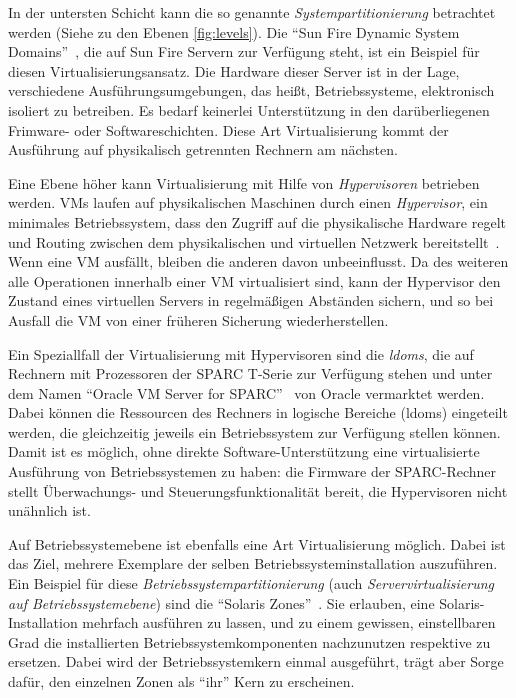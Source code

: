 In der untersten Schicht kann die so genannte
\emph{Systempartitionierung} betrachtet werden (Siehe zu den Ebenen
\autoref{fig:levels}). Die "`Sun Fire Dynamic System
Domains"'~\cite{Shoumack2007:Beginners-Guid-}, die auf Sun Fire
Servern zur Verfügung steht, ist ein Beispiel für diesen
Virtualisierungsansatz. Die Hardware dieser Server ist in der Lage,
verschiedene Ausführungsumgebungen, das heißt, Betriebssysteme,
elektronisch isoliert zu betreiben. Es bedarf keinerlei Unterstützung
in den darüberliegenen Frimware- oder Softwareschichten. Diese Art
Virtualisierung kommt der Ausführung auf physikalisch getrennten
Rechnern am nächsten.

Eine Ebene höher kann Virtualisierung mit Hilfe von
\emph{Hypervisoren} betrieben werden. \acfp{VM} laufen auf
physikalischen Maschinen durch einen \emph{Hypervisor}, ein minimales
Betriebssystem, dass den Zugriff auf die physikalische Hardware regelt
und Routing zwischen dem physikalischen und virtuellen Netzwerk
bereitstellt~\cite{tanenbaum1992modern}. Wenn eine \ac{VM} ausfällt,
bleiben die anderen davon unbeeinflusst. Da des weiteren alle
Operationen innerhalb einer \ac{VM} virtualisiert sind, kann der Hypervisor
den Zustand eines virtuellen Servers in regelmäßigen Abständen
sichern, und so bei Ausfall die \ac{VM} von einer früheren Sicherung
wiederherstellen.

Ein Speziallfall der Virtualisierung mit Hypervisoren sind die
\emph{\acfp{ldom}}, die auf Rechnern mit Prozessoren der SPARC T-Serie
zur Verfügung stehen und unter dem Namen "`Oracle VM Server for
SPARC"'~\cite{Corporation:Oracle-VM-Serve} von Oracle vermarktet
werden. Dabei können die Ressourcen des Rechners in logische Bereiche
(\aclp{ldom}) eingeteilt werden, die gleichzeitig jeweils ein
Betriebssystem zur Verfügung stellen können. Damit ist es möglich,
ohne direkte Software-Unterstützung eine virtualisierte Ausführung
von Betriebssystemen zu haben: die Firmware der SPARC-Rechner stellt
Überwachungs- und Steuerungsfunktionalität bereit, die Hypervisoren
nicht unähnlich ist.

Auf Betriebssystemebene ist ebenfalls eine Art Virtualisierung
möglich. Dabei ist das Ziel, mehrere Exemplare der selben
Betriebssysteminstallation auszuführen. Ein Beispiel für diese
\emph{Betriebssystempartitionierung} (auch \emph{Servervirtualisierung
  auf Betriebssystemebene}) sind die "`Solaris
Zones"'~\cite{price2004solaris}. Sie erlauben, eine
Solaris-Installation mehrfach ausführen zu lassen, und zu einem
gewissen, einstellbaren Grad die installierten
Betriebssystemkomponenten nachzunutzen respektive zu ersetzen. Dabei
wird der Betriebssystemkern einmal ausgeführt, trägt aber Sorge dafür,
den einzelnen Zonen als "`ihr"' Kern zu erscheinen.


